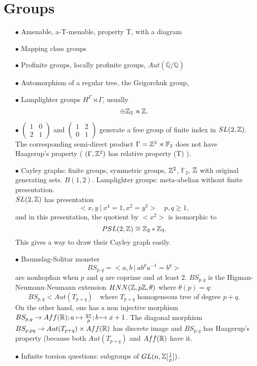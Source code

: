 \newpage
\section{Groups}

\begin{itemize}
\item[$\bullet$] Amenable, a-T-menable, property T, with a diagram
\item[$\bullet$] Mapping class groups 
\item[$\bullet$] Profinite groups, locally profinite groups, $Aut(\overline{\mathbb Q} /\mathbb Q)$
\item[$\bullet$] Automorphism of a regular tree, the Grigorchuk group,
\item[$\bullet$] Lamplighter groups $ H^\Gamma\rtimes \Gamma$, usually 
\[\oplus \mathbb Z_2 \rtimes \mathbb Z.\]
\item[$\bullet$] $\begin{pmatrix}1 & 0 \\ 2 & 1\end{pmatrix}$ and $\begin{pmatrix}1 & 2 \\ 0 & 1\end{pmatrix}$ generate a free group of finite index in $SL(2,\mathbb Z)$. The corresponding semi-direct product $\Gamma = \mathbb Z^2\rtimes \mathbb F_2$ does not have Haagerup's property ( $(\Gamma, \mathbb Z^2)$ has relative property (T) ).\\

\item[$\bullet$] Cayley graphs: finite groups, symmetric groups, $\mathbb Z^2$, $\mathbb F_2$, $\mathbb Z$ with original generating sets. $B(1,2)$. Lamplighter groups: meta-abelian without finite presentation. \\

$SL(2,\mathbb Z)$ has presentation 
\[<x,y \ | \ x^4=1, x^2=y^3> \quad p,q \geq 1,\] 
and in this presentation, the quotient by $<x^2>$ is isomorphic to \[PSL(2,\mathbb Z)\cong \mathbb Z_2 \ast \mathbb Z_3.\] This gives a way to draw their Cayley graph easily.\\

\item[$\bullet$] Baumslag-Solitar monster
\[BS_{p,q} = <a,b \ | \ ab^p a^{-1} = b^q>\]
are nonhopfian when $p$ and $q$ are coprime and at least $2$. $BS_{p,q}$ is the Higman-Neumann-Neumann extension $HNN(\mathbb Z,p \mathbb Z, \theta)$ where $\theta(p)=q$: 
\[BS_{p,q} < Aut(T_{p+q}) \quad \text{where } T_{p+q}\text{ homogeneous tree of degree }p+q.\]
On the other hand, one has a non injective morphism $BS_{p,q}\rightarrow Aff(\mathbb R); a \mapsto \frac{qx}{p} ; b\mapsto x+1$. The diagonal morphism $BS_{p,pq} \rightarrow Aut(T_{p+q})\times Aff(\mathbb R)$ has discrete image and $BS_{p,q}$ has Haagerup's property (because both $Aut(T_{p+q})$ and $Aff(\mathbb R)$ have it.\\

\item[$\bullet$] Infinite torsion questions: subgroups of $GL(n, \mathbb Z[\frac{1}{p}])$.\\
\end{itemize}

